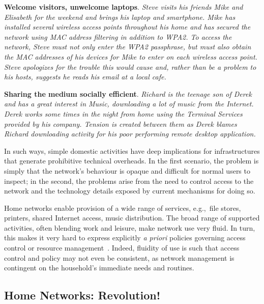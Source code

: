 \textbf{Welcome visitors, unwelcome laptops}.  {\it Steve visits his friends
  Mike and Elisabeth for the weekend and brings his laptop and smartphone.  Mike
  has installed several wireless access points throughout his home and has
  secured the network using MAC address filtering in addition to WPA2.  To
  access the network, Steve must not only enter the WPA2 passphrase, but must
  also obtain the MAC addresses of his devices for Mike to enter on each
  wireless access point.  Steve apologizes for the trouble this would cause and,
  rather than be a problem to his hosts, suggests he reads his email at a local
  cafe.} 

\textbf{Sharing the medium socially efficient}.  {\it Richard is the teenage son
  of Derek and has a great interest in Music, downloading a lot of music from the
  Internet. Derek works some times in the night from home using the Terminal
  Services provided by his company. Tension is created between them as Derek
  blames Richard downloading activity for his poor performing remote desktop
  application. } 

In such ways, simple domestic activities have deep implications for
infrastructures that generate prohibitive technical overheads.  In the first
scenario, the problem is simply that the network's behaviour is opaque and
difficult for normal users to inspect; in the second, the problems arise from
the need to control access to the network and the technology details exposed by
current mechanisms for doing so.  

Home networks enable provision of a wide range of services, e.g.,~file stores,
printers, shared Internet access, music distribution.  The broad range of
supported activities, often blending work and leisure, make network use very
fluid.  In turn, this makes it very hard to express explicitly \emph{a priori}
policies governing access control or resource management~\cite{tolmie07}.
Indeed, fluidity of use is such that access control and policy may not even be
consistent, as network management is contingent on the household's immediate
needs and routines.

\subsection{Home Networks: Revolution!} \label{s:revolution}

